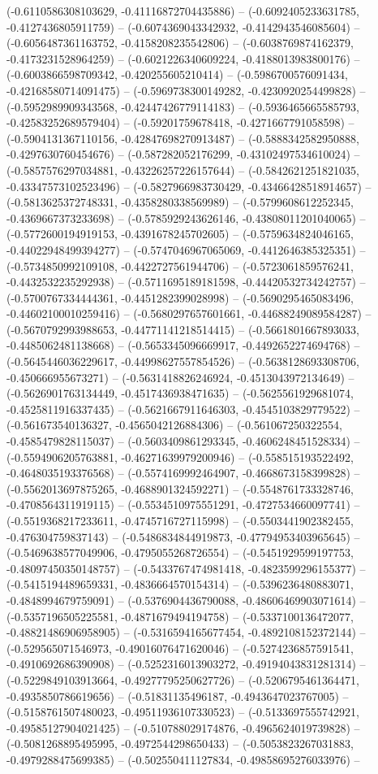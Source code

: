 (-0.6110586308103629, -0.41116872704435886) -- (-0.6092405233631785, -0.4127436805911759) -- (-0.6074369043342932, -0.4142943546085604) -- (-0.6056487361163752, -0.4158208235542806) -- (-0.6038769874162379, -0.4173231528964259) -- (-0.6021226340609224, -0.4188013983800176) -- (-0.6003866598709342, -0.420255605210414) -- (-0.5986700576091434, -0.42168580714091475) -- (-0.5969738300149282, -0.4230920254499828) -- (-0.5952989909343568, -0.42447426779114183) -- (-0.5936465665585793, -0.42583252689579404) -- (-0.59201759678418, -0.4271667791058598) -- (-0.5904131367110156, -0.42847698270913487) -- (-0.5888342582950888, -0.4297630760454676) -- (-0.587282052176299, -0.43102497534610024) -- (-0.5857576297034881, -0.43226257226157644) -- (-0.5842621251821035, -0.43347573102523496) -- (-0.5827966983730429, -0.43466428518914657) -- (-0.5813625372748331, -0.4358280338569989) -- (-0.5799608612252345, -0.4369667373233698) -- (-0.5785929243626146, -0.43808011201040065) -- (-0.5772600194919153, -0.4391678245702605) -- (-0.5759634824046165, -0.44022948499394277) -- (-0.5747046967065069, -0.4412646385325351) -- (-0.5734850992109108, -0.4422727561944706) -- (-0.5723061859576241, -0.4432532235292938) -- (-0.5711695189181598, -0.44420532734242757) -- (-0.5700767334444361, -0.4451282399028998) -- (-0.5690295465083496, -0.44602100010259416) -- (-0.5680297657601661, -0.44688249089584287) -- (-0.5670792993988653, -0.44771141218514415) -- (-0.5661801667893033, -0.4485062481138668) -- (-0.5653345096669917, -0.4492652274694768) -- (-0.5645446036229617, -0.44998627557854526) -- (-0.5638128693308706, -0.450666955673271) -- (-0.5631418826246924, -0.4513043972134649) -- (-0.5626901763134449, -0.4517436938471635) -- (-0.5625561929681074, -0.4525811916337435) -- (-0.5621667911646303, -0.4545103829779522) -- (-0.561673540136327, -0.4565042126884306) -- (-0.561067250322554, -0.4585479828115037) -- (-0.5603409861293345, -0.4606248451528334) -- (-0.5594906205763881, -0.46271639979200946) -- (-0.558515193522492, -0.4648035193376568) -- (-0.5574169992464907, -0.4668673158399828) -- (-0.5562013697875265, -0.4688901324592271) -- (-0.5548761733328746, -0.4708564311919115) -- (-0.5534510975551291, -0.4727534660097741) -- (-0.5519368217233611, -0.4745716727115998) -- (-0.5503441902382455, -0.476304759837143) -- (-0.5486834844919873, -0.47794953403965645) -- (-0.5469638577049906, -0.4795055268726554) -- (-0.5451929599197753, -0.48097450350148757) -- (-0.5433767474981418, -0.4823599296155377) -- (-0.5415194489659331, -0.4836664570154314) -- (-0.5396236480883071, -0.4848994679759091) -- (-0.5376904436790088, -0.48606469903071614) -- (-0.5357196505225581, -0.4871679494194758) -- (-0.5337100136472077, -0.48821486906958905) -- (-0.5316594165677454, -0.4892108152372144) -- (-0.529565071546973, -0.49016076471620046) -- (-0.5274236857591541, -0.4910692686390908) -- (-0.5252316013903272, -0.49194043831281314) -- (-0.5229849103913664, -0.49277795250627726) -- (-0.5206795461364471, -0.4935850786619656) -- (-0.51831135496187, -0.4943647023767005) -- (-0.5158761507480023, -0.49511936107330523) -- (-0.5133697555742921, -0.49585127904021425) -- (-0.510788029174876, -0.4965624019739828) -- (-0.5081268895495995, -0.4972544298650433) -- (-0.5053823267031883, -0.4979288475699385) -- (-0.502550411127834, -0.49858695276033976) -- 
